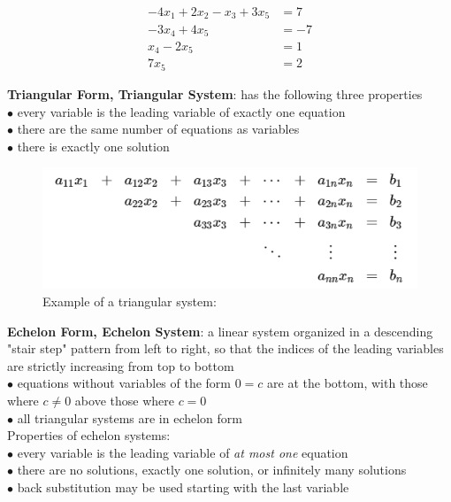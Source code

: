         \begin{align*}
            -4x_1 + 2x_2 - x_3 + 3x_5   &= 7 \\
            -3x_4 + 4x_5                &= -7 \\
            x_4 - 2x_5                  &= 1 \\
            7x_5                        &= 2
        \end{align*}

        \textbf{Triangular Form, Triangular System}: has the following three properties \\
        $\bullet$ every variable is the leading variable of exactly one equation \\
        $\bullet$ there are the same number of equations as variables \\
        $\bullet$ there is exactly one solution

        \begin{figure}[hbt!]
            \centering
            \caption*{Example of a triangular system:}
            \includegraphics[scale = 0.75]{Assets/1_Triangular_System}
        \end{figure}

        \textbf{Echelon Form, Echelon System}: a linear system organized in a descending "stair step" pattern from left to right, so that the indices of the leading variables are strictly increasing from top to bottom \\
        $\bullet$ equations without variables of the form $0=c$ are at the bottom, with those where $c\not = 0$ above those where $c=0$ \\
        $\bullet$ all triangular systems are in echelon form \\

        Properties of echelon systems: \\
        $\bullet$ every variable is the leading variable of \textit{at most one} equation \\
        $\bullet$ there are no solutions, exactly one solution, or infinitely many solutions \\
        $\bullet$ back substitution may be used starting with the last variable

